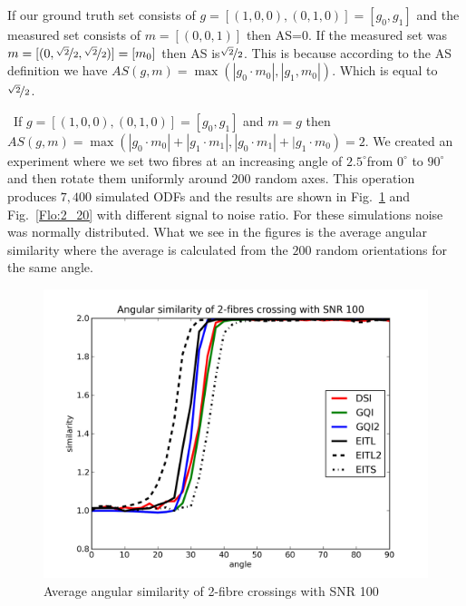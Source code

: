 \documentclass{bioinfo}
\begin{document}
If our ground truth set consists of $g=[(1,0,0),(0,1,0)]=[g_{0},g_{1}]$
and the measured set consists of $m=[(0,0,1)]$ then AS=$0$. If the
measured set was $m=[(0,\nicefrac{\sqrt{2}}{2},\nicefrac{\sqrt{2}}{2})]=[m_{0}]$
then AS\foreignlanguage{british}{ is$\nicefrac{\sqrt{2}}{2}$. This
is because according to the AS definition we have $AS(g,m)=\max(|g_{0}\cdot m_{0}|,|g_{1},m_{0}|)$.
Which is equal to $\nicefrac{\sqrt{2}}{2}$.}

%
\noindent~If $g=[(1,0,0),(0,1,0)]=[g_{0},g_{1}]$ and $m=g$ then
$AS(g,m)=\max(|g_{0}\cdot m_{0}|+|g_{1}\cdot m_{1}|,|g_{0}\cdot m_{1}|+|g_{1}\cdot m_{0})=2.$
We created an experiment where we set two fibres at an increasing
angle of \foreignlanguage{english}{$2.5^{\circ}$}from $0^{\circ}$
to $90^{\circ}$ and then rotate them uniformly around $200$ random
axes. This operation produces $7,400$ simulated ODFs and the results
are shown in Fig.~\ref{Flo:2_100} and Fig.~\ref{Flo:2_20} with
different signal to noise ratio. For these simulations noise was normally
distributed. What we see in the figures is the average angular similarity
where the average is calculated from the $200$ random orientations
for the same angle.

%
%
\begin{figure}
\begin{centering}
\includegraphics[scale=0.5]{figures/2_100}
\par\end{centering}

\caption{Average angular similarity of 2-fibre crossings with SNR 100}


\label{Flo:2_100}
\end{figure}
\end{document}
